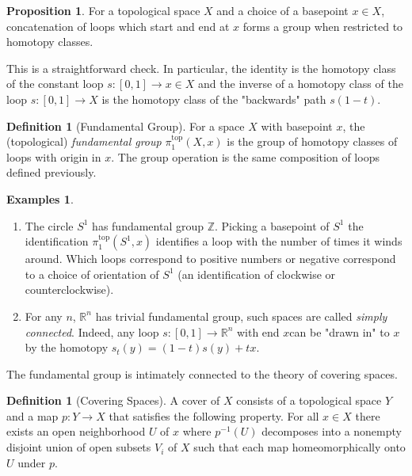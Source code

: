 \documentclass{article}
\theoremstyle{definition}
\newtheorem{proposition}[theorem]{Proposition}
\newtheorem{definition}[theorem]{Definition}
\newtheorem{examples}[theorem]{Examples}
\theoremstyle{remark}
\newcommand{\R}{\mathbb{R}}
\newcommand{\Z}{\mathbb{Z}}
\begin{document}
\begin{proposition}
	For a topological space $X$ and a choice of a basepoint $x \in X$, concatenation of loops which start and end at $x$ forms a group when restricted to homotopy classes.
\end{proposition}

This is a straightforward check. 
In particular, the identity is the homotopy class of the constant loop $s: [0,1] \to x \in X$ and the inverse of a homotopy class of the loop $s: [0,1] \to X$ is the homotopy class of the "backwards" path $s(1-t)$.

\begin{definition}[Fundamental Group]
	For a space $X$ with basepoint $x$, the (topological) \textit{fundamental group} $\pi^{\text{top}}_1(X,x)$	is the group of homotopy classes of loops with origin in $x$.
	The group operation is the same composition of loops defined previously.
\end{definition}

\begin{examples} \text{} 
	\begin{enumerate}
		\item The circle $S^1$ has fundamental group $\Z$. 
			Picking a basepoint of $S^1$ the identification $\pi_1^{\text{top}}(S^1,x)$ identifies a loop with the number of times it winds around.
			Which loops correspond to positive numbers or negative correspond to a choice of orientation of $S^1$ (an identification of clockwise or counterclockwise).
		\item For any $n$, $\R^n$ has trivial fundamental group, such spaces are called \textit{simply connected}.
			Indeed, any loop $s: [0,1] \to \R^n$ with end $x $can be "drawn in" to $x$ by the homotopy $s_t(y) = (1-t)s(y) + tx$.
	\end{enumerate}
	
\end{examples}

The fundamental group is intimately connected to the theory of covering spaces. 

\begin{definition}[Covering Spaces]
	A cover of $X$ consists of a topological space $Y$ and a map $p:Y \to X$ that satisfies the following property. 
	For all $x \in X$ there exists an open neighborhood $U$ of $x$ where $p^{-1}(U)$ decomposes into a nonempty disjoint union of open subsets $V_i$ of $X$ such that each map homeomorphically onto $U$ under $p$.
\end{definition}
\end{document}
